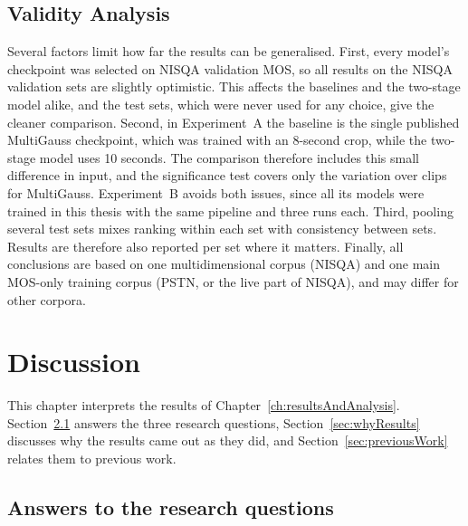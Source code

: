 \documentclass[
english,                 %
bibtex,                  %
includeExtraAbstracts, %
]{kththesis}
\numberwithin{listing}{chapter}
\begin{document}
\section{Validity Analysis}
\label{sec:validityAnalysis}

Several factors limit how far the results can be generalised. First, every model's checkpoint was selected on NISQA validation MOS, so all results on the NISQA validation sets are slightly optimistic. This affects the baselines and the two-stage model alike, and the test sets, which were never used for any choice, give the cleaner comparison. Second, in Experiment~A the baseline is the single published MultiGauss checkpoint, which was trained with an 8-second crop, while the two-stage model uses 10 seconds. The comparison therefore includes this small difference in input, and the significance test covers only the variation over clips for MultiGauss. Experiment~B avoids both issues, since all its models were trained in this thesis with the same pipeline and three runs each. Third, pooling several test sets mixes ranking within each set with consistency between sets. Results are therefore also reported per set where it matters. Finally, all conclusions are based on one multidimensional corpus (NISQA) and one main MOS-only training corpus (PSTN, or the live part of NISQA), and may differ for other corpora.

\cleardoublepage
\chapter{Discussion}
\label{ch:discussion}

This chapter interprets the results of Chapter~\ref{ch:resultsAndAnalysis}. Section~\ref{sec:rqAnswers} answers the three research questions, Section~\ref{sec:whyResults} discusses why the results came out as they did, and Section~\ref{sec:previousWork} relates them to previous work.

\section{Answers to the research questions}
\label{sec:rqAnswers}
\end{document}
